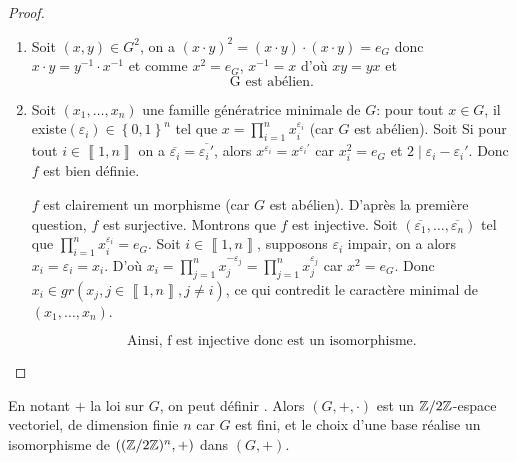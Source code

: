 \begin{proof}
	\phantom{}
	\begin{enumerate}
		\item Soit $(x,y)\in G^{2}$, on a $(x\cdot y)^{2}=(x\cdot y)\cdot (x\cdot y)=e_{G}$ donc $x\cdot y=y^{-1}\cdot x^{-1}$ et comme $x^{2}=e_{G}$, $x^{-1}=x$ d'où $xy=yx$ et 
		\begin{equation}
			\boxed{\text{G est abélien.}}
		\end{equation}
		
		\item Soit $(x_{1},\dots,x_{n})$ une famille génératrice minimale de $G$: pour tout $x\in G$, il existe$(\varepsilon_{i})\in\left\{0,1\right\}^{n}$ tel que $x=\prod_{i=1}^{n}x_{i}^{\varepsilon_{i}}$ (car $G$ est abélien).
		Soit 
		Si pour tout $i\in\left\llbracket 1,n\right\rrbracket$ on a $\overline{\varepsilon_{i}}=\overline{\varepsilon_{i}'}$, alors $x^{\varepsilon_{i}}=x^{\varepsilon_{i}'}$ car $x_{i}^{2}=e_{G}$ et $2\mid\varepsilon_{i}-\varepsilon_{i}'$. Donc $f$ est bien définie.

		$f$ est clairement un morphisme (car $G$ est abélien). D'après la première question, $f$ est surjective. Montrons que $f$ est injective. Soit $(\overline{\varepsilon_{1}},\dots,\overline{\varepsilon_{n}})$ tel que $\prod_{i=1}^{n}x_{i}^{\varepsilon_{i}}=e_{G}$. Soit $i\in\left\llbracket 1,n\right\rrbracket$, supposons $\varepsilon_{i}$ impair, on a alors $x_{i}=\varepsilon_{i}=x_{i}$. D'où $x_{i}=\prod_{j=1}^{n}x_{j}^{-\varepsilon_{j}}=\prod_{j=1}^{n}x_{j}^{\varepsilon_{j}}$ car $x^{2}=e_{G}$. Donc $x_{i}\in gr(x_{j},j\in\left\llbracket 1,n\right\rrbracket, j\neq i)$, ce qui contredit le caractère minimal de $(x_{1},\dots,x_{n})$. 
		
		\begin{equation}
			\boxed{\text{Ainsi, f est injective donc est un isomorphisme.}}
		\end{equation}
	\end{enumerate}
\end{proof}

\begin{remark}
	En notant $+$ la loi sur $G$, on peut définir . Alors $(G,+,\cdot)$ est un $\mathbb{Z}/2\mathbb{Z}$-espace vectoriel, de dimension finie $n$ car $G$ est fini, et le choix d'une base réalise un isomorphisme de $((\mathbb{Z}/2\mathbb{Z})^{n},+)$ dans $(G,+)$.
\end{remark}

